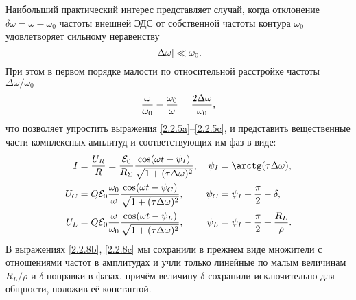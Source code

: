 Наибольший практический интерес представляет случай, когда отклонение
$\delta\omega=\omega-\omega_0$ частоты внешней ЭДС от собственной частоты
контура $\omega_0$ удовлетворяет сильному неравенству
\begin{equation}\eqmark{2.2.6}
	|\Delta\omega| \ll \omega_0.
\end{equation}
При этом в первом порядке малости по относительной расстройке частоты
$\Delta\omega/\omega_0$
\begin{equation}\eqmark{2.2.7}
\dfrac{\omega}{\omega_0}-\dfrac{\omega_0}{\omega}=
\dfrac{2\Delta\omega}{\omega_0},
\end{equation}
что позволяет упростить выражения \eqref{2.2.5a}--\eqref{2.2.5c},
и представить вещественные части комплексных амплитуд 
и соответствующих им фаз в виде:
\begin{align}
			\eqmark{2.2.8a}
    	I & =\dfrac{U_R}{R}=\dfrac{\mathcal{E}_0}{R_{\Sigma}}
            \dfrac{\cos(\omega t-\psi_I)}{\sqrt{1+(\tau\Delta\omega)^2}}, &
        \psi_I &= \arctg (\tau\Delta\omega), \\
			\eqmark{2.2.8b}
		U_C &= Q\mathcal{E}_0\dfrac{\omega_0}{\omega}
            \dfrac{\cos(\omega t-\psi_C)}{\sqrt{1+(\tau\Delta\omega)^2}}, &
        \psi_C &= \psi_I +\dfrac{\pi}{2}-\delta, \\
			\eqmark{2.2.8c}
			U_L & =Q\mathcal{E}_0\dfrac{\omega}{\omega_0}
                \dfrac{\cos(\omega t-\psi_L)}{\sqrt{1+(\tau\Delta\omega)^2}}, &
        \psi_L & = \psi_I -\dfrac{\pi}{2}+\dfrac{R_L}{\rho}.
\end{align}
В выражениях \eqref{2.2.8b}, \eqref{2.2.8c} мы сохранили в прежнем виде
множители с отношениями частот в амплитудах и учли только линейные по малым
величинам $R_L/\rho$ и $\delta$ поправки в фазах, причём величину $\delta$
сохранили исключительно для общности, положив её константой.

